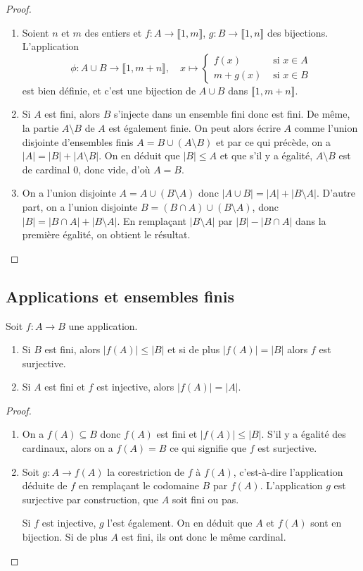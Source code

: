 \begin{proof}
\begin{enumerate}
\item Soient $n$ et $m$ des entiers et $f : A\to \llbracket 1,m\rrbracket$, $g : B\to \llbracket 1,n\rrbracket$ des bijections. L'application 
\[
\phi : A\cup B \to \llbracket 1,m+n\rrbracket, \quad x\mapsto
\begin{cases}
f(x) & \text{ si }x\in A\\
m+g(x) & \text{ si }x\in B
\end{cases}
\]
est bien définie, et c'est une bijection de $A\cup B$ dans $\llbracket 1,m+n\rrbracket$.
\item Si $A$ est fini, alors $B$ s'injecte dans un ensemble fini donc est fini. De même, la partie $A\setminus B$ de $A$ est également finie. On peut alors écrire $A$ comme l'union disjointe d'ensembles finis $A=B \cup (A\setminus B)$ et par ce qui précède, on a $|A|=|B|+|A\setminus B|$. On en déduit que $|B|\leq A$ et que s'il y a égalité, $A\setminus B$ est de cardinal $0$, donc vide, d'où $A=B$.
\item On a l'union disjointe $A = A\cup (B\setminus A)$  donc $|A\cup B| = |A|+|B\setminus A|$.
D'autre part, on a l'union disjointe $B = (B\cap A) \cup (B\setminus A)$, donc $|B| = |B\cap A|+|B\setminus A|$.
En remplaçant $|B\setminus A|$ par $|B|-|B\cap A|$ dans la première égalité, on obtient le résultat.
\end{enumerate}
\end{proof}

\subsection{Applications et ensembles finis}

\begin{proposition}
Soit $f : A\to B$ une application.
\begin{enumerate}
\item Si $B$ est fini, alors $|f(A)|\leq |B|$ et si de plus $|f(A)|= |B|$ alors $f$ est surjective.
\item Si $A$ est fini et $f$ est injective, alors $|f(A)|=|A|$.
\end{enumerate}
\end{proposition}
\begin{proof}
\begin{enumerate}
\item On a $f(A)\subseteq B$ donc $f(A)$ est fini et $|f(A)|\leq |B|$. S'il y a égalité des cardinaux, alors on a $f(A)=B$ ce qui signifie que $f$ est surjective.
\item Soit $g : A\to f(A)$ la corestriction de $f$ à $f(A)$, c'est-à-dire l'application déduite de $f$ en remplaçant le codomaine $B$ par $f(A)$. L'application $g$ est surjective par construction, que $A$ soit fini ou pas.

Si $f$ est injective, $g$ l'est également. On en déduit que $A$ et $f(A)$ sont en bijection. Si de plus $A$ est fini, ils ont donc le même cardinal.
\end{enumerate}
\end{proof}

